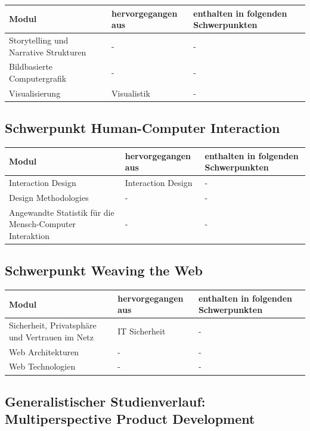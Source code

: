 \begin{longtable}[c]{@{}lll@{}}
\toprule
Modul & hervorgegangen aus & enthalten in folgenden
Schwerpunkten\tabularnewline
\midrule
\endhead
Storytelling und Narrative Strukturen & - & -\tabularnewline
Bildbasierte Computergrafik & - & -\tabularnewline
Visualisierung & Visualistik & -\tabularnewline
\bottomrule
\end{longtable}

\subsection{Schwerpunkt Human-Computer
Interaction}\label{schwerpunkt-human-computer-interaction}

\begin{longtable}[c]{@{}lll@{}}
\toprule
Modul & hervorgegangen aus & enthalten in folgenden
Schwerpunkten\tabularnewline
\midrule
\endhead
Interaction Design & Interaction Design & -\tabularnewline
Design Methodologies & - & -\tabularnewline
Angewandte Statistik für die Mensch-Computer Interaktion & - &
-\tabularnewline
\bottomrule
\end{longtable}

\subsection{Schwerpunkt Weaving the
Web}\label{schwerpunkt-weaving-the-web}

\begin{longtable}[c]{@{}lll@{}}
\toprule
Modul & hervorgegangen aus & enthalten in folgenden
Schwerpunkten\tabularnewline
\midrule
\endhead
Sicherheit, Privatsphäre und Vertrauen im Netz & IT Sicherheit &
-\tabularnewline
Web Architekturen & - & -\tabularnewline
Web Technologien & - & -\tabularnewline
\bottomrule
\end{longtable}

\subsection{Generalistischer Studienverlauf: Multiperspective Product
Development}\label{generalistischer-studienverlauf-multiperspective-product-development}

